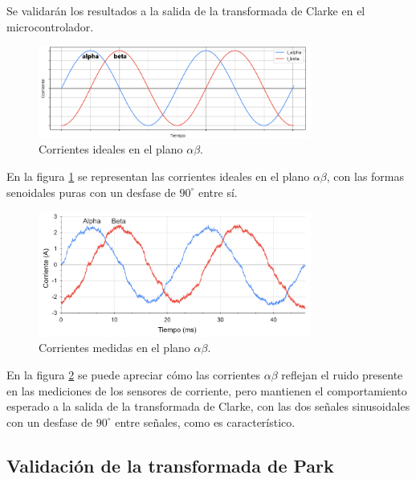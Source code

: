 \documentclass[11pt]{report}
\begin{document}
Se validarán los resultados a la salida de la transformada de Clarke en el microcontrolador.

\begin{figure}[ht]
	\centering
	\includegraphics[width=0.8\textwidth]{imagenes/graficas/Corrientes_AlphaBeta_ideal.png}
	\caption{Corrientes ideales en el plano $\alpha\beta$.}
	\label{corrientes_alpha_beta_ideal}
\end{figure}
\FloatBarrier

En la figura \ref{corrientes_alpha_beta_ideal} se representan las corrientes ideales en el plano $\alpha\beta$, con las formas senoidales puras con un desfase de $90^\circ$ entre sí.

\begin{figure}[ht]
	\centering
	\includegraphics[width=0.8\textwidth]{imagenes/graficas/Corrientes_AlphaBeta.png}
	\caption{Corrientes medidas en el plano $\alpha\beta$.}
	\label{corrientes_alpha_beta}
\end{figure}
\FloatBarrier

En la figura \ref{corrientes_alpha_beta} se puede apreciar cómo las corrientes $\alpha\beta$ reflejan el ruido presente en las mediciones de los sensores de corriente, pero mantienen el comportamiento esperado a la salida de la transformada de Clarke, con las dos señales sinusoidales con un desfase de $90^\circ$ entre señales, como es característico.

\newpage
\subsection{Validación de la transformada de Park}
\end{document}
